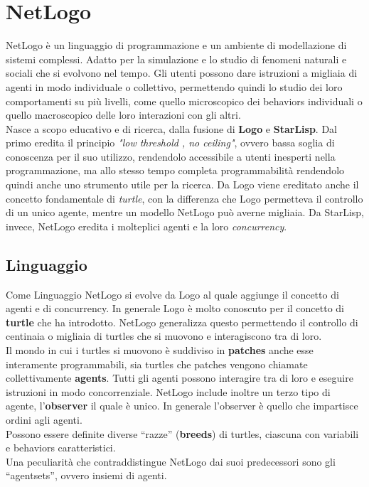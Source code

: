 \chapter {NetLogo} 
NetLogo è un linguaggio di programmazione e un ambiente di modellazione di sistemi complessi. Adatto per la simulazione e lo studio di fenomeni naturali e sociali che si evolvono nel tempo. Gli utenti possono dare istruzioni a migliaia di agenti in modo individuale o collettivo, permettendo quindi lo studio dei loro comportamenti su più livelli, come quello microscopico dei behaviors individuali o quello macroscopico delle loro interazioni con gli altri.\\
Nasce a scopo educativo e di ricerca, dalla fusione di \textbf{Logo} e \textbf{StarLisp}. Dal primo eredita il principio \textit{"low threshold , no ceiling"}, ovvero bassa soglia di conoscenza per il suo utilizzo, rendendolo accessibile a utenti inesperti nella programmazione, ma allo stesso tempo completa programmabilità rendendolo quindi anche uno strumento utile per la ricerca. Da Logo viene ereditato anche il concetto fondamentale di \textit{turtle}, con la differenza che Logo permetteva il controllo di un unico agente, mentre un modello NetLogo può averne migliaia. Da StarLisp, invece, NetLogo eredita i molteplici agenti e la loro \textit{concurrency}.\\
\section{Linguaggio}
Come Linguaggio NetLogo si evolve da Logo al quale aggiunge il concetto di agenti e di concurrency. In generale Logo è molto conoscuto per il concetto di \textbf{turtle} che ha introdotto. NetLogo generalizza questo permettendo il controllo di centinaia o migliaia di turtles che si muovono e interagiscono tra di loro.\\
Il mondo in cui i turtles si muovono è suddiviso in \textbf{patches} anche esse interamente programmabili, sia turtles che patches vengono chiamate collettivamente \textbf{agents}. Tutti gli agenti possono interagire tra di loro e eseguire istruzioni in modo concorrenziale. NetLogo include inoltre un terzo tipo di agente, l'\textbf{observer} il quale è unico. In generale l'observer è quello che impartisce ordini agli agenti.\\
Possono essere definite diverse “razze” (\textbf{breeds}) di turtles, ciascuna con variabili e behaviors caratteristici.\\
Una peculiarità che contraddistingue NetLogo dai suoi predecessori sono gli “agentsets”, ovvero insiemi di agenti.




 
